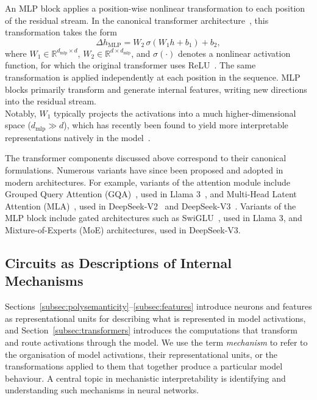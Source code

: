 \begin{definitionbox}
An MLP block applies a position-wise nonlinear transformation to each position of the residual stream. In the canonical transformer architecture~, this transformation takes the form
\[
\Delta h_{\text{MLP}} = W_2 \,\sigma(W_1h+b_1)+b_2,
\]
where $W_1 \in \mathbb{R}^{d_{\text{mlp}}\times d}$, $W_2 \in \mathbb{R}^{d\times d_{\text{mlp}}}$, and $\sigma(\cdot)$ denotes a nonlinear activation function, for which the original transformer uses ReLU~. The same transformation is applied independently at each position in the sequence. MLP blocks primarily
transform and generate internal features, writing new directions into the
residual stream.\\

Notably, $W_1$ typically projects the activations into a much higher-dimensional space ($d_{\text{mlp}} \gg d$), which has recently been found to yield more interpretable representations natively in the model~.

\end{definitionbox}

The transformer components discussed above correspond to their canonical formulations. Numerous variants have since been proposed and adopted in modern architectures. For example, variants of the attention module include Grouped Query Attention (GQA)~, used in Llama 3~, and Multi-Head Latent Attention (MLA)~, used in DeepSeek-V2~ and DeepSeek-V3~. Variants of the MLP block include gated architectures such as SwiGLU~, used in Llama 3, and Mixture-of-Experts (MoE) architectures, used in DeepSeek-V3.



\subsection{Circuits as Descriptions of Internal Mechanisms}
\label{subsec:circuits}

Sections~\ref{subsec:polysemanticity}--\ref{subsec:features} introduce neurons and features as representational units for describing what is represented in model activations, and Section~\ref{subsec:transformers} introduces the computations that transform and route activations through the model. We use the term \emph{mechanism} to refer to the organisation of model activations, their representational units, or the transformations applied to them that together produce a particular model behaviour. A central topic in mechanistic interpretability is identifying and understanding such mechanisms in neural networks.

